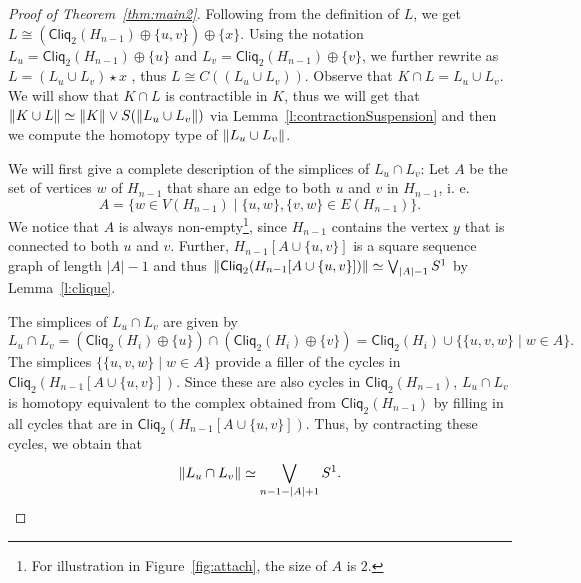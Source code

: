 \documentclass[a4paper, v2021]{lipics-v2021}
\theoremstyle{plain}
\theoremstyle{definition}
\newcommand{\Cliq}[2]{\mathsf{Cliq}_{#1}(#2)}
\DeclarePairedDelimiter{\gr}{\lVert}{\rVert}
\begin{document}
\begin{proof}[Proof of Theorem~\ref{thm:main2}]
Following from the definition of $L$, we get $L \cong (\Cliq{2}{H_{n-1}} \oplus \{u,v\} )\oplus \{x\}$. Using the notation $L_u = \Cliq{2}{H_{n-1}} \oplus \{u\}$ and $L_v = \Cliq{2}{H_{n-1}} \oplus \{v\}$, we further rewrite as $L = (L_u \cup L_v) \star x$ , thus $L \cong C((L_u \cup L_v))$. Observe that $K\cap L = L_u \cup L_v$. We will show that $K\cap L$ is contractible in $K$, thus we will get that $\gr{K \cup L} \simeq \gr{K} \vee S(\gr{L_u \cup L_v})$ via Lemma~\ref{l:contractionSuspension} and then we compute the homotopy type of $\gr{L_u \cup L_v}$.

We will first give a complete description of the simplices of $L_u \cap L_v$: Let $A$ be the set of vertices $w$ of $H_{n-1}$ that share an edge to both $u$ and $v$ in $H_{n-1}$, i. e. 
\[A = \{w \in V(H_{n-1}) \mid \{u,w\}, \{v,w\} \in E(H_{n-1})\}.\]
We notice that $A$ is always non-empty\footnote{For illustration in Figure~\ref{fig:attach}, the size of $A$ is $2$.}, since $H_{n-1}$ contains the vertex $y$ that is connected to both $u$ and $v$. Further, $H_{n-1}[A \cup \{u,v\}]$ is a square sequence graph of length $|A|-1$ and thus $\gr{\Cliq{2}{H_{n-1}[A \cup \{u,v\}]}} \simeq \bigvee_{|A|-1} S^1$ by Lemma~\ref{l:clique}.

The simplices of $L_u \cap L_v$ are given by
\[
L_u \cap L_v  = (\Cliq{2}{H_i} \oplus \{u\}) \cap (\Cliq{2}{H_i} \oplus \{v\}) = \Cliq{2}{H_i} \cup \{\{u,v,w\} \mid w \in A\}.
\]
The simplices $\{\{u,v,w\} \mid w \in A\}$ provide a filler of the cycles in $\Cliq{2}{H_{n-1}[A \cup \{u,v\}]}$. Since these are also cycles in $\Cliq{2}{H_{n-1}}$, $L_u \cap L_v$ is homotopy equivalent to the complex obtained from $\Cliq{2}{H_{n-1}}$ by filling in all cycles that are in $\Cliq{2}{H_{n-1}[A \cup \{u,v\}]}$. Thus, by contracting these cycles, we obtain that
\[
\gr{L_u \cap L_v} \simeq \bigvee_{{n-1} - |A| + 1} S^1.
\]


\end{proof}
\end{document}
